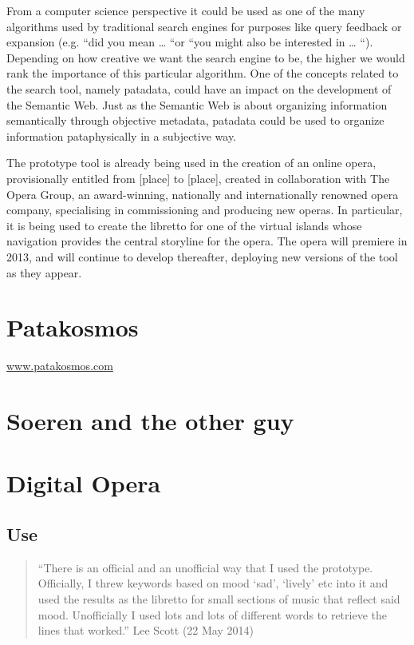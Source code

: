 From a computer science perspective it could be used as one of the many algorithms used by traditional search engines for purposes like query feedback or expansion (e.g. “did you mean … “or “you might also be interested in … “). Depending on how creative we want the search engine to be, the higher we would rank the importance of this particular algorithm. One of the concepts related to the search tool, namely patadata, could have an impact on the development of the Semantic Web. Just as the Semantic Web is about organizing information semantically through objective metadata, patadata could be used to organize information pataphysically in a subjective way.

The prototype tool is already being used in the creation of an online opera, provisionally entitled from [place] to [place], created in collaboration with The Opera Group, an award-winning, nationally and internationally renowned opera company, specialising in commissioning and producing new operas. In particular, it is being used to create the libretto for one of the virtual islands whose navigation provides the central storyline for the opera. The opera will premiere in 2013, and will continue to develop thereafter, deploying new versions of the tool as they appear.


\section{Patakosmos}

\url{www.patakosmos.com}

\section{Soeren and the other guy}

\section{Digital Opera}

\subsection{Use}

\begin{quote}
  ``There is an official and an unofficial way that I used the prototype. Officially, I threw keywords based on mood `sad', `lively' etc into it and used the results as the libretto for small sections of music that reflect said mood. Unofficially I used lots and lots of different words to retrieve the lines that worked.'' Lee Scott (22 May 2014)
\end{quote}

